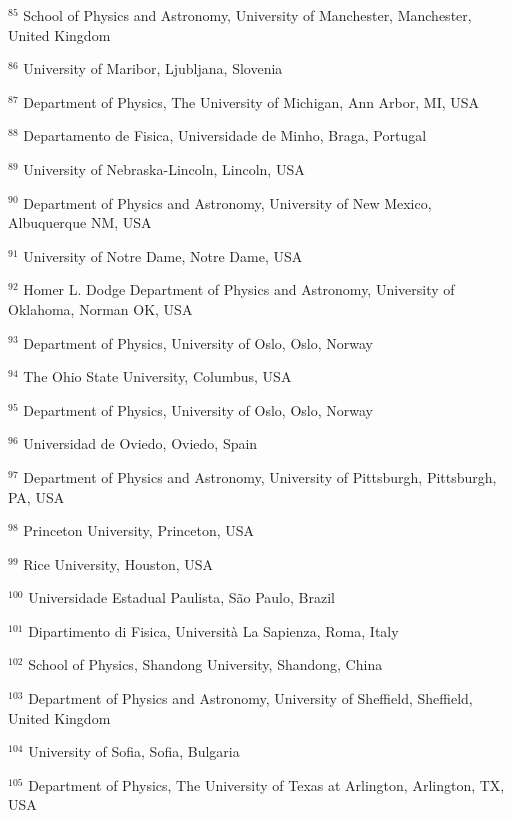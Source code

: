 \par {\footnotesize $^{85}$ School of Physics and Astronomy, University of Manchester, Manchester, United Kingdom}
\par {\footnotesize $^{86}$ University of Maribor, Ljubljana, Slovenia}
\par {\footnotesize $^{87}$ Department of Physics, The University of Michigan, Ann Arbor, MI, USA}
\par {\footnotesize $^{88}$ Departamento de Fisica, Universidade de Minho, Braga, Portugal}
\par {\footnotesize $^{89}$ University of Nebraska-Lincoln, Lincoln, USA}
\par {\footnotesize $^{90}$ Department of Physics and Astronomy, University of New Mexico, Albuquerque NM, USA}
\par {\footnotesize $^{91}$ University of Notre Dame, Notre Dame, USA}
\par {\footnotesize $^{92}$ Homer L. Dodge Department of Physics and Astronomy, University of Oklahoma, Norman OK, USA}
\par {\footnotesize $^{93}$ Department of Physics, University of Oslo, Oslo, Norway}
\par {\footnotesize $^{94}$ The Ohio State University, Columbus, USA}
\par {\footnotesize $^{95}$ Department of Physics, University of Oslo, Oslo, Norway}
\par {\footnotesize $^{96}$ Universidad de Oviedo, Oviedo, Spain}
\par {\footnotesize $^{97}$ Department of Physics and Astronomy, University of Pittsburgh, Pittsburgh, PA, USA}
\par {\footnotesize $^{98}$ Princeton University, Princeton, USA}
\par {\footnotesize $^{99}$ Rice University, Houston, USA}
\par {\footnotesize $^{100}$ Universidade Estadual Paulista, São Paulo, Brazil}
\par {\footnotesize $^{101}$ Dipartimento di Fisica, Università La Sapienza, Roma, Italy}
\par {\footnotesize $^{102}$ School of Physics, Shandong University, Shandong, China}
\par {\footnotesize $^{103}$ Department of Physics and Astronomy, University of Sheffield, Sheffield, United Kingdom}
\par {\footnotesize $^{104}$ University of Sofia, Sofia, Bulgaria}
\par {\footnotesize $^{105}$ Department of Physics, The University of Texas at Arlington, Arlington, TX, USA}
